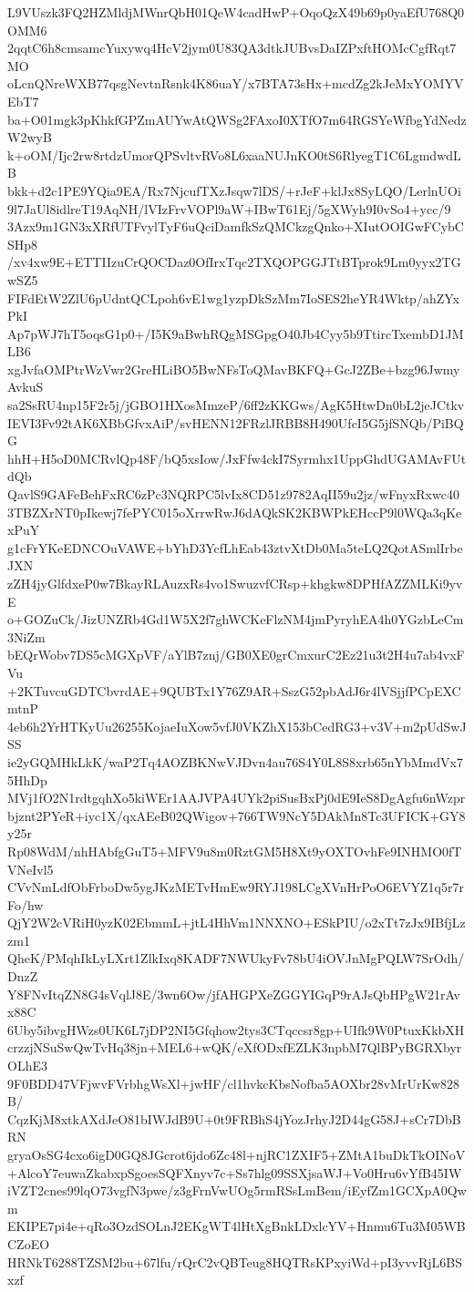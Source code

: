 L9VUszk3FQ2HZMldjMWnrQbH01QeW4cadHwP+OqoQzX49b69p0yaEfU768Q0OMM6
2qqtC6h8cmsamcYuxywq4HcV2jym0U83QA3dtkJUBvsDaIZPxftHOMcCgfRqt7MO
oLcnQNreWXB77qsgNevtnRsnk4K86uaY/x7BTA73sHx+mcdZg2kJeMxYOMYVEbT7
ba+O01mgk3pKhkfGPZmAUYwAtQWSg2FAxoI0XTfO7m64RGSYeWfbgYdNedzW2wyB
k+oOM/Ijc2rw8rtdzUmorQPSvltvRVo8L6xaaNUJnKO0tS6RlyegT1C6LgmdwdLB
bkk+d2c1PE9YQia9EA/Rx7NjcufTXzJsqw7lDS/+rJeF+klJx8SyLQO/LerlnUOi
9l7JaUl8idlreT19AqNH/lVIzFrvVOPl9aW+IBwT61Ej/5gXWyh9I0vSo4+ycc/9
3Azx9m1GN3xXRfUTFvylTyF6uQciDamfkSzQMCkzgQnko+XIutOOIGwFCybCSHp8
/xv4xw9E+ETTIIzuCrQOCDaz0OfIrxTqc2TXQOPGGJTtBTprok9Lm0yyx2TGwSZ5
FIFdEtW2ZlU6pUdntQCLpoh6vE1wg1yzpDkSzMm7IoSES2heYR4Wktp/ahZYxPkI
Ap7pWJ7hT5oqsG1p0+/I5K9aBwhRQgMSGpgO40Jb4Cyy5b9TtircTxembD1JMLB6
xgJvfaOMPtrWzVwr2GreHLiBO5BwNFsToQMavBKFQ+GcJ2ZBe+bzg96JwmyAvkuS
sa2SsRU4np15F2r5j/jGBO1HXosMmzeP/6ff2zKKGws/AgK5HtwDn0bL2jeJCtkv
IEVI3Fv92tAK6XBbGfvxAiP/svHENN12FRzlJRBB8H490UfcI5G5jfSNQb/PiBQG
hhH+H5oD0MCRvlQp48F/bQ5xsIow/JxFfw4ckI7Syrmhx1UppGhdUGAMAvFUtdQb
QavlS9GAFeBehFxRC6zPc3NQRPC5lvIx8CD51z9782AqII59u2jz/wFnyxRxwc40
3TBZXrNT0pIkewj7fePYC015oXrrwRwJ6dAQkSK2KBWPkEHccP9l0WQa3qKexPuY
g1cFrYKeEDNCOuVAWE+bYhD3YcfLhEab43ztvXtDb0Ma5teLQ2QotASmlIrbeJXN
zZH4jyGlfdxeP0w7BkayRLAuzxRs4vo1SwuzvfCRsp+khgkw8DPHfAZZMLKi9yvE
o+GOZuCk/JizUNZRb4Gd1W5X2f7ghWCKeFlzNM4jmPyryhEA4h0YGzbLeCm3NiZm
bEQrWobv7DS5cMGXpVF/aYlB7znj/GB0XE0grCmxurC2Ez21u3t2H4u7ab4vxFVu
+2KTuvcuGDTCbvrdAE+9QUBTx1Y76Z9AR+SszG52pbAdJ6r4lVSjjfPCpEXCmtnP
4eb6h2YrHTKyUu26255KojaeIuXow5vfJ0VKZhX153bCedRG3+v3V+m2pUdSwJSS
ie2yGQMHkLkK/waP2Tq4AOZBKNwVJDvn4au76S4Y0L8S8xrb65nYbMmdVx75HhDp
MVj1fO2N1rdtgqhXo5kiWEr1AAJVPA4UYk2piSusBxPj0dE9IeS8DgAgfu6nWzpr
bjznt2PYeR+iyc1X/qxAEeB02QWigov+766TW9NcY5DAkMn8Tc3UFICK+GY8y25r
Rp08WdM/nhHAbfgGuT5+MFV9u8m0RztGM5H8Xt9yOXTOvhFe9INHMO0fTVNeIvl5
CVvNmLdfObFrboDw5ygJKzMETvHmEw9RYJ198LCgXVnHrPoO6EVYZ1q5r7rFo/hw
QjY2W2cVRiH0yzK02EbmmL+jtL4HhVm1NNXNO+ESkPIU/o2xTt7zJx9IBfjLzzm1
QheK/PMqhIkLyLXrt1ZlkIxq8KADF7NWUkyFv78bU4iOVJnMgPQLW7SrOdh/DnzZ
Y8FNvItqZN8G4sVqlJ8E/3wn6Ow/jfAHGPXeZGGYIGqP9rAJsQbHPgW21rAvx88C
6Uby5ibvgHWzs0UK6L7jDP2NI5Gfqhow2tys3CTqccsr8gp+UIfk9W0PtuxKkbXH
crzzjNSuSwQwTvHq38jn+MEL6+wQK/eXfODxfEZLK3npbM7QlBPyBGRXbyrOLhE3
9F0BDD47VFjwvFVrbhgWsXl+jwHF/cl1hvkcKbsNofba5AOXbr28vMrUrKw828B/
CqzKjM8xtkAXdJeO81bIWJdB9U+0t9FRBhS4jYozJrhyJ2D44gG58J+sCr7DbBRN
gryaOsSG4cxo6igD0GQ8JGcrot6jdo6Zc48l+njRC1ZXIF5+ZMtA1buDkTkOINoV
+AlcoY7euwaZkabxpSgoesSQFXnyv7c+Ss7hlg09SSXjsaWJ+Vo0Hru6vYfB45IW
iVZT2cnes99lqO73vgfN3pwe/z3gFrnVwUOg5rmRSsLmBem/iEyfZm1GCXpA0Qwm
EKIPE7pi4e+qRo3OzdSOLnJ2EKgWT4lHtXgBnkLDxlcYV+Hnmu6Tu3M05WBCZoEO
HRNkT6288TZSM2bu+67lfu/rQrC2vQBTeug8HQTRsKPxyiWd+pI3yvvRjL6BSxzf
